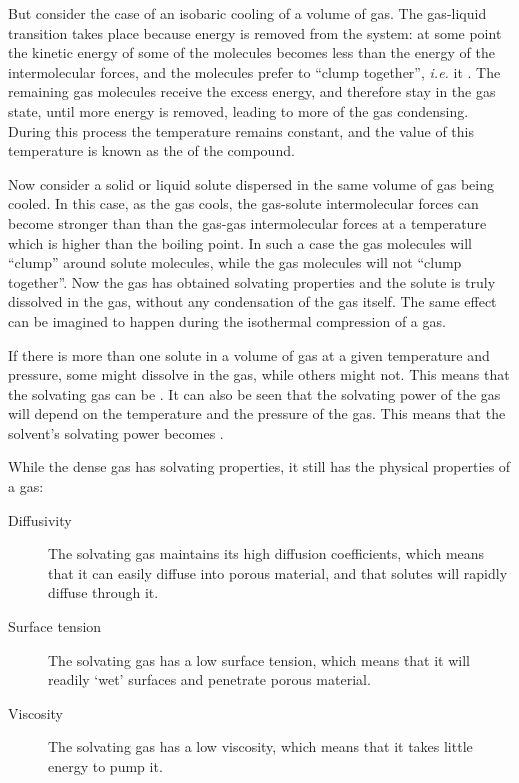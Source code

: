 But consider the case of an isobaric cooling of a volume of gas. The gas-liquid
transition takes place because energy is removed from the system: at some point
the kinetic energy of some of the molecules becomes less than the energy of the
intermolecular forces, and the molecules prefer to ``clump together'', \textit{i.e.}
it . The remaining gas molecules receive the excess energy,
and therefore stay in the gas state, until more energy is removed, leading to
more of the gas condensing. During this process the temperature remains
constant, and the value of this temperature is known as the  of the compound.

Now consider a solid or liquid solute dispersed in the same volume of gas being
cooled. In this case, as the gas cools, the gas-solute intermolecular forces can
become stronger than than the gas-gas intermolecular forces at a temperature
which is higher than the boiling point. In such a case the gas molecules will
``clump'' around solute molecules, while the gas molecules will not ``clump
together''. Now the gas has obtained solvating properties and the solute is
truly dissolved in the gas, without any condensation of the gas itself. The same
effect can be imagined to happen during the isothermal compression of a gas.

If there is more than one solute in a volume of gas at a given temperature and
pressure, some might dissolve in the gas, while others might not. This means
that the solvating gas can be . It can also be seen that the
solvating power of the gas will depend on the temperature and the pressure of
the gas. This means that the solvent's solvating power becomes
.

While the dense gas has solvating properties, it still has the physical
properties of a gas:

\begin{description} 

\item[Diffusivity] The solvating gas maintains its high diffusion coefficients,
which means that it can easily diffuse into porous material, and that solutes
will rapidly diffuse through it.

\item[Surface tension] The solvating gas has a low surface tension, which means
that it will readily `wet' surfaces and penetrate porous material.

\item[Viscosity] The solvating gas has a low viscosity, which means that it
takes little energy to pump it.

\end{description} 


